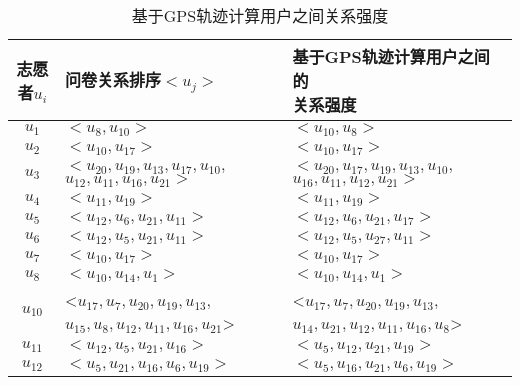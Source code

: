 \begin{table}[htbp]
\wuhao
  \centering
  \caption[基于GPS轨迹计算用户之间关系强度]{基于GPS轨迹计算用户之间关系强度}
  \label{tab:result_tra}
    \begin{tabular}{cll}%
      \toprule[1.5pt]
      {志愿者\mbox{$u_{i}$}} & {问卷关系排序\mbox{$<u_{j}>$}} & \tabincell{c}{基于GPS轨迹计算用户之间的\\ 关系强度} \\
      \midrule[1pt]
      \mbox{$u_{1}$} & \mbox{$<u_{8},u_{10}>$} & \mbox{$<u_{10},u_{8}>$}  \\
      \hline
      \mbox{$u_{2}$} & \mbox{$<u_{10},u_{17}>$} & \mbox{$<u_{10},u_{17}>$}  \\
      \hline
      \mbox{$u_{3} $}&\tabincell{c}{$ <u_{20},u_{19},u_{13},u_{17},u_{10},$\\ $u_{12},u_{11},u_{16},u_{21}>$} &\tabincell{c}{$ <u_{20},u_{17},u_{19},u_{13},u_{10},$ \\ $u_{16},u_{11},u_{12},u_{21}>$}\\
      \hline
      \mbox{$u_{4}$} & \mbox{$<u_{11},u_{19}>$} & \mbox{$<u_{11},u_{19}>$} \\
      \hline
      \mbox{$u_{5} $}& \mbox{$<u_{12},u_{6},u_{21},u_{11}>$} & \mbox{$<u_{12},u_{6},u_{21},u_{17}>$} \\
      \hline
      \mbox{$u_{6}$} & \mbox{$<u_{12},u_{5},u_{21},u_{11}>$} & \mbox{$<u_{12},u_{5},u_{27},u_{11}>$}\\
      \hline
      \mbox{$u_{7}$} & \mbox{$<u_{10},u_{17}>$} & \mbox{$<u_{10},u_{17}>$} \\
      \hline
      \mbox{$u_{8}$} &\mbox{$ <u_{10},u_{14},u_{1}>$} &\mbox{$ <u_{10},u_{14},u_{1}>$} \\
      \hline
      \mbox{$u_{10} $}& \tabincell{c}{<$u_{17},u_{7},u_{20},u_{19},u_{13},$\\ $u_{15},u_{8},u_{12},u_{11},u_{16},u_{21}$>} & \tabincell{c}{<$u_{17},u_{7},u_{20},u_{19},u_{13},$\\ $u_{14},u_{21},u_{12},u_{11},u_{16},u_{8}$>}\\
      \hline
      \mbox{$u_{11} $}&  \mbox{$<u_{12},u_{5},u_{21},u_{16}>$} &  \mbox{$<u_{5},u_{12},u_{21},u_{19}>$}\\
      \hline
      \mbox{$u_{12} $}& \mbox{$ <u_{5},u_{21},u_{16},u_{6},u_{19}>$} & \mbox{$ <u_{5},u_{16},u_{21},u_{6},u_{19}>$}\\

\end{tabular}
\end{table}

